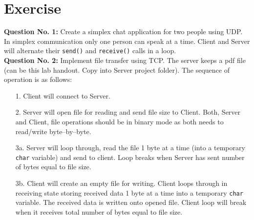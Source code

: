 \documentclass[12pt,a4paper]{article}
\begin{document}
\section{Exercise}
\noindent\textbf{Question No. 1:} Create a simplex chat application for two people using UDP. In simplex communication only one person can speak at a time. Client and Server will alternate their \verb|send()| and \verb|receive()| calls in a loop. \\
\noindent\textbf{Question No. 2:} Implement file transfer using TCP. The server keeps a pdf file (can be this lab handout. Copy into Server project folder). The sequence of operation is as follows:
\begin{enumerate}
\item[1.] Client will connect to Server.
\item[2.] Server will open file for reading and send file size to Client. Both, Server and Client, file operations should be in binary mode as both needs to read/write byte--by--byte.
\item[3a.] Server will loop through, read the file 1 byte at a time (into a temporary \verb|char| variable) and send to client. Loop breaks when Server has sent number of bytes equal to file size.
\item[3b.] Client will create an empty file for writing. Client loops through in receiving state storing received data 1 byte at a time into a temporary \verb|char| variable. The received data is written onto opened file. Client loop will break when it receives total number of bytes equal to file size.
\end{enumerate}
\end{document}
